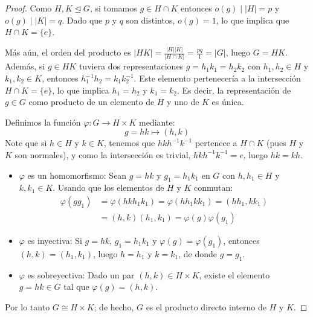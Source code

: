 \begin{proof}
    Como $H, K \trianglelefteq G$, si tomamos $g \in H \cap K$ entonces $o(g) \mid |H|=p$ y $o(g) \mid |K|=q$. Dado que $p$ y $q$ son distintos, $o(g)=1$, lo que implica que $H \cap K = \{e\}$.
    
    Más aún, el orden del producto es $|HK| = \frac{|H||K|}{|H \cap K|} = \frac{pq}{1} = |G|$, luego $G = HK$. Además, si $g \in HK$ tuviera dos representaciones $g = h_1 k_1 = h_2 k_2$ con $h_1, h_2 \in H$ y $k_1, k_2 \in K$, entonces $h_1^{-1} h_2 = k_1 k_2^{-1}$. Este elemento pertenecería a la intersección $H \cap K = \{e\}$, lo que implica $h_1 = h_2$ y $k_1 = k_2$. Es decir, la representación de $g \in G$ como producto de un elemento de $H$ y uno de $K$ es única.
    
    Definimos la función $\varphi: G \to H \times K$ mediante:
    \begin{equation*}
        g = hk \mapsto (h, k)
    \end{equation*}
    Note que si $h \in H$ y $k \in K$, tenemos que $hkh^{-1}k^{-1}$ pertenece a $H \cap K$ (pues $H$ y $K$ son normales), y como la intersección es trivial, $hkh^{-1}k^{-1} = e$, luego $hk = kh$.

    \begin{itemize}
        \item $\varphi$ es un homomorfismo:
        Sean $g=hk$ y $g_1=h_1k_1$ en $G$ con $h, h_1 \in H$ y $k, k_1 \in K$. Usando que los elementos de $H$ y $K$ conmutan:
        \begin{align*}
            \varphi(gg_1) &= \varphi(hkh_1k_1) = \varphi(hh_1kk_1) = (hh_1, kk_1) \\
            &= (h, k)(h_1, k_1) = \varphi(g)\varphi(g_1)
        \end{align*}

        \item $\varphi$ es inyectiva:
        Si $g=hk$, $g_1=h_1k_1$ y $\varphi(g)=\varphi(g_1)$, entonces $(h, k)=(h_1, k_1)$, luego $h=h_1$ y $k=k_1$, de donde $g=g_1$.

        \item $\varphi$ es sobreyectiva:
        Dado un par $(h, k) \in H \times K$, existe el elemento $g=hk \in G$ tal que $\varphi(g)=(h, k)$.
    \end{itemize}
    
    Por lo tanto $G \cong H \times K$; de hecho, $G$ es el producto directo interno de $H$ y $K$.
\end{proof}

